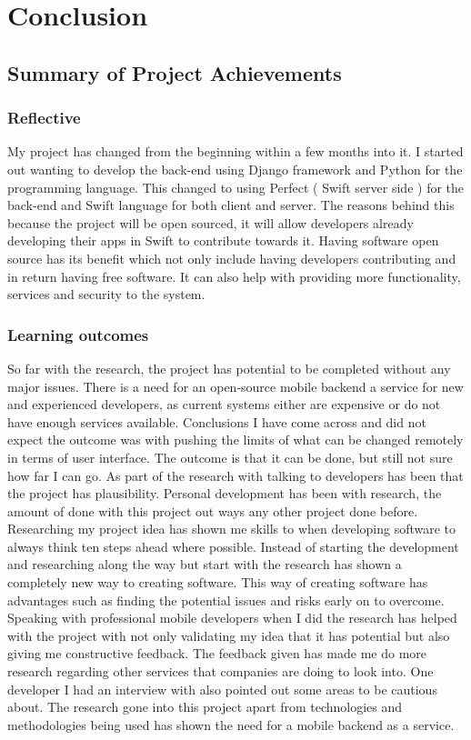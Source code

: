 \chapter{Conclusion}

\label{ch:conclusions}

\section{Summary of Project Achievements}

\subsection{Reflective}

My project has changed from the beginning within a few months into it. I started out wanting to develop the back-end using Django framework and Python for the programming language. This changed to using Perfect ( Swift server side ) for the back-end and Swift language for both client and server. The reasons behind this because the project will be open sourced, it will allow developers already developing their apps in Swift to contribute towards it. Having software open source has its benefit which not only include having developers contributing and in return having free software. It can also help with providing more functionality, services and security to the system.

\subsection{Learning outcomes}

So far with the research, the project has potential to be completed without any major issues. There is a need for an open-source mobile backend a service for new and experienced developers, as current systems either are expensive or do not have enough services available. Conclusions I have come across and did not expect the outcome was with pushing the limits of what can be changed remotely in terms of user interface. The outcome is that it can be done, but still not sure how far I can go. As part of the research with talking to developers has been that the project has plausibility.
Personal development has been with research, the amount of done with this project out ways any other project done before. Researching my project idea has shown me skills to when developing software to always think ten steps ahead where possible. Instead of starting the development and researching along the way but start with the research has shown a completely new way to creating software. This way of creating software has advantages such as finding the potential issues and risks early on to overcome.
Speaking with professional mobile developers when I did the research has helped with the project with not only validating my idea that it has potential but also giving me constructive feedback. The feedback given has made me do more research regarding other services that companies are doing to look into. One developer I had an interview with also pointed out some areas to be cautious about. The research gone into this project apart from technologies and methodologies being used has shown the need for a mobile backend as a service.

